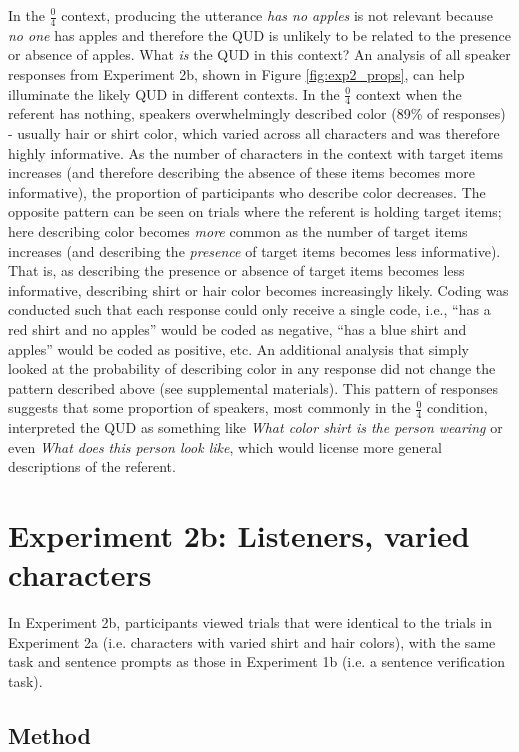 \documentclass[man, floatsintext, noapacite]{apa6}
\begin{document}
In the $\frac{0}{4}$ context, producing the utterance \textit{has no apples} is not relevant because \textit{no one} has apples and therefore the QUD is unlikely to be related to the presence or absence of apples. What \textit{is} the QUD in this context? An analysis of all speaker responses from Experiment 2b, shown in Figure \ref{fig:exp2_props}, can help illuminate the likely QUD in different contexts. In the $\frac{0}{4}$ context when the referent has nothing, speakers overwhelmingly described color (89\% of responses) - usually hair or shirt color, which varied across all characters and was therefore highly informative. As the number of characters in the context with target items increases (and therefore describing the absence of these items becomes more informative), the proportion of participants who describe color decreases. The opposite pattern can be seen on trials where the referent is holding target items; here describing color becomes \textit{more} common as the number of target items increases (and describing the \textit{presence} of target items becomes less informative). That is, as describing the presence or absence of target items becomes less informative, describing shirt or hair color becomes increasingly likely. Coding was conducted such that each response could only receive a single code, i.e., ``has a red shirt and no apples'' would be coded as negative, ``has a blue shirt and apples'' would be coded as positive, etc. An additional analysis that simply looked at the probability of describing color in any response did not change the pattern described above (see supplemental materials). This pattern of responses suggests that some proportion of speakers, most commonly in the $\frac{0}{4}$ condition, interpreted the QUD as something like \textit{What color shirt is the person wearing} or even \textit{What does this person look like}, which would license more general descriptions of the referent.  

\section{Experiment 2b: Listeners, varied characters}

In Experiment 2b, participants viewed trials that were identical to the trials in Experiment 2a (i.e. characters with varied shirt and hair colors), with the same task and sentence prompts as those in Experiment 1b (i.e. a sentence verification task). 

\subsection{Method}
\end{document}
